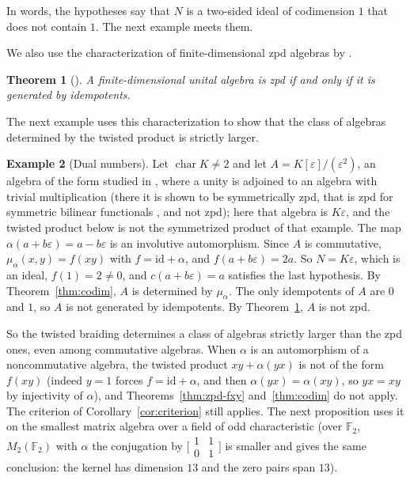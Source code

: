 \documentclass[]{interact}
\theoremstyle{plain}
\newtheorem{theorem}{Theorem}[section]
\theoremstyle{definition}
\newtheorem{example}[theorem]{Example}
\theoremstyle{remark}
\begin{document}
In words, the hypotheses say that $N$ is a two-sided ideal of codimension $1$ that does not contain $1$. %
The next example meets them. %

We also use the characterization of finite-dimensional zpd algebras by \citet[Theorem 2.27]{Bresar2021}.

\begin{theorem}[{\citep[Theorem 2.27]{Bresar2021}}]\label{thm:bresar-idempotents}
A finite-dimensional unital algebra is zpd if and only if it is generated by idempotents.
\end{theorem}

The next example uses this characterization to show that the class of algebras determined by the twisted product is strictly larger. %

\begin{example}[Dual numbers]\label{ex:dual}
Let $\operatorname{char} K \neq 2$ and let $A = K[\varepsilon]/(\varepsilon^2)$, an algebra of the form studied in \citep[Example 2.23]{Bresar2021}, where a unity is adjoined to an algebra with trivial multiplication (there it is shown to be symmetrically zpd, that is zpd for symmetric bilinear functionals \citep[Definition 1.12]{Bresar2021}, and not zpd); here that algebra is $K\varepsilon$, and the twisted product below is not the symmetrized product of that example. %
The map $\alpha(a + b\varepsilon) = a - b\varepsilon$ is an involutive automorphism.
Since $A$ is commutative, $\mu_\alpha(x,y) = f(xy)$ with $f = \mathrm{id} + \alpha$, and $f(a + b\varepsilon) = 2a$.
So $N = K\varepsilon$, which is an ideal, $f(1) = 2 \neq 0$, and $c(a + b\varepsilon) = a$ satisfies the last hypothesis.
By Theorem~\ref{thm:codim}, $A$ is determined by $\mu_\alpha$.
The only idempotents of $A$ are $0$ and $1$, so $A$ is not generated by idempotents.
By Theorem~\ref{thm:bresar-idempotents}, $A$ is not zpd.
\end{example}

So the twisted braiding determines a class of algebras strictly larger than the zpd ones, even among commutative algebras.
When $\alpha$ is an automorphism of a noncommutative algebra, the twisted product $xy + \alpha(yx)$ is not of the form $f(xy)$ (indeed $y = 1$ forces $f = \mathrm{id} + \alpha$, and then $\alpha(yx) = \alpha(xy)$, so $yx = xy$ by injectivity of $\alpha$), and Theorems~\ref{thm:zpd-fxy} and~\ref{thm:codim} do not apply.
The criterion of Corollary~\ref{cor:criterion} still applies.
The next proposition uses it on the smallest matrix algebra over a field of odd characteristic (over $\mathbb{F}_2$, $M_2(\mathbb{F}_2)$ with $\alpha$ the conjugation by $\bigl[\begin{smallmatrix}1&1\\0&1\end{smallmatrix}\bigr]$ is smaller and gives the same conclusion: the kernel has dimension $13$ and the zero pairs span $13$). %
\end{document}
